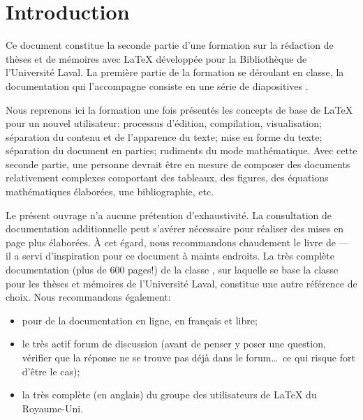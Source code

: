 \chapter{Introduction}
\label{chap:introduction}

Ce document constitue la seconde partie d'une formation sur la
rédaction de thèses et de mémoires avec {\LaTeX} développée pour la
Bibliothèque de l'Université Laval. La première partie de
la formation se déroulant en classe, la documentation qui
l'accompagne consiste en une série de diapositives
\citep{UL:latex:1}.

Nous reprenons ici la formation une fois présentés les concepts de
base de {\LaTeX} pour un nouvel utilisateur: processus d'édition,
compilation, visualisation; séparation du contenu et de l'apparence du
texte; mise en forme du texte; séparation du document en parties;
rudiments du mode mathématique. Avec cette seconde partie, une
personne devrait être en mesure de composer des documents relativement
complexes comportant des tableaux, des figures, des équations
mathématiques élaborées, une bibliographie, etc.

Le présent ouvrage n'a aucune prétention d'exhaustivité. La
consultation de documentation additionnelle peut s'avérer nécessaire
pour réaliser des mises en page plus élaborées. À cet égard, nous
recommandons chaudement le livre de \citet{Kopka:latex:4e} --- il a
servi d'inspiration pour ce document à maints endroits. La très
complète documentation (plus de 600 pages!) de la classe
 \citep{memoir}, sur laquelle se base la classe
 pour les thèses et mémoires de l'Université Laval,
constitue une autre référence de choix. Nous recommandons également:
\begin{itemize}
\item {} pour de la documentation en ligne, en français et
  libre;
\item le très actif forum de discussion
  (avant de penser y poser une question, vérifier que la réponse ne se trouve
  pas déjà dans le forum\dots\ ce qui risque fort d'être le cas);
\item la très complète
   (en anglais) du groupe des
  utilisateurs de {\LaTeX} du Royaume-Uni.
\end{itemize}

